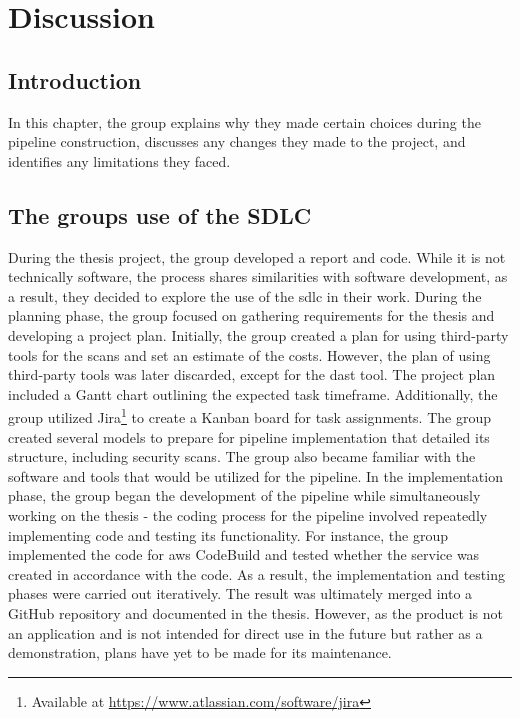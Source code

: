 \newpage
\thispagestyle{empty}
\mbox{}

\chapter{Discussion}
\section{Introduction}
In this chapter, the group explains why they made certain choices during the pipeline construction, discusses any changes they made to the project, and identifies any limitations they faced.

\section{The groups use of the SDLC} %
During the thesis project, the group developed a report and code. While it is not technically software, the process shares similarities with software development, as a result, they decided to explore the use of the \acrshort{sdlc} in their work.
During the planning phase, the group focused on gathering requirements for the thesis and developing a project plan. Initially, the group created a plan for using third-party tools for the scans and set an estimate of the costs. However, the plan of using third-party tools was later discarded, except for the \acrshort{dast} tool. The project plan included a Gantt chart outlining the expected task timeframe. Additionally, the group utilized Jira\footnote{Available at \url{https://www.atlassian.com/software/jira}} to create a Kanban board for task assignments. The group created several models to prepare for pipeline implementation that detailed its structure, including security scans. The group also became familiar with the software and tools that would be utilized for the pipeline.
In the implementation phase, the group began the development of the pipeline while simultaneously working on the thesis - the coding process for the pipeline involved repeatedly implementing code and testing its functionality. For instance, the group implemented the code for \acrshort{aws} CodeBuild and tested whether the service was created in accordance with the code. As a result, the implementation and testing phases were carried out iteratively.
The result was ultimately merged into a GitHub repository and documented in the thesis. However, as the product is not an application and is not intended for direct use in the future but rather as a demonstration, plans have yet to be made for its maintenance. 

